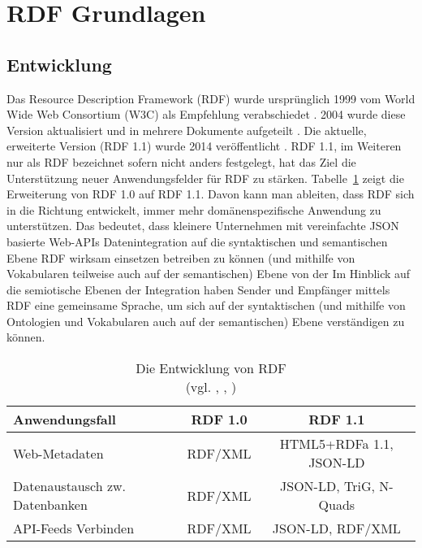 \section{RDF Grundlagen}
\subsection{Entwicklung}
\label{sec:entwicklung}

Das Resource Description Framework (RDF) wurde ursprünglich 1999 vom World Wide Web Consortium (W3C) als Empfehlung verabschiedet \parencite{Lassila:99:RMS}. 2004 wurde diese Version aktualisiert und in mehrere Dokumente aufgeteilt \parencite{Beckett:04:RSS}. Die aktuelle, erweiterte Version (RDF 1.1) wurde 2014 veröffentlicht \parencite{Schreiber:14:RP}. RDF 1.1, im Weiteren nur als RDF bezeichnet sofern nicht anders festgelegt, hat das Ziel die Unterstützung neuer Anwendungsfelder für RDF zu stärken. Tabelle~\ref{tab:rdf} zeigt die Erweiterung von RDF 1.0 auf RDF 1.1. Davon kann man ableiten, dass RDF sich in die Richtung entwickelt, immer mehr domänenspezifische Anwendung zu unterstützen. Das bedeutet, dass kleinere Unternehmen mit vereinfachte JSON basierte Web-APIs Datenintegration auf die syntaktischen und semantischen\footnotemark{} Ebene RDF wirksam einsetzen betreiben zu können (und mithilfe von Vokabularen teilweise auch auf der semantischen) Ebene von der Im Hinblick auf die semiotische Ebenen der Integration \parencite[vgl.]{Schissler2004} haben Sender und Empfänger mittels RDF eine gemeinsame Sprache, um sich auf der syntaktischen (und mithilfe von Ontologien und Vokabularen auch auf der semantischen) Ebene verständigen zu können. 

\begin{table}[h]
	\centering
	\begin{tabular}{|p{9em}|c|c|}
		\hline \rule[-2ex]{0pt}{5.5ex} Anwendungsfall & RDF 1.0 & RDF 1.1 \\ 
		\hline \rule[-2ex]{0pt}{5.5ex} Web-Metadaten & RDF/XML & HTML5+RDFa 1.1, JSON-LD\\ 
		\hline \rule[-2ex]{0pt}{5.5ex} Datenaustausch zw. Datenbanken\footnotemark{}& RDF/XML & JSON-LD, TriG, N-Quads  \\
		\hline \rule[-2ex]{0pt}{5.5ex} API-Feeds Verbinden \footnotemark[\value{footnote}] & RDF/XML& JSON-LD, RDF/XML\\ 
		\hline
	\end{tabular}
	\caption{Die Entwicklung von RDF\\ (vgl. \cite[Abs.~2]{Klyne:04:RDF}, \cite[Abs.~2]{Schreiber:14:RP}, \cite{Wood:14:WNR})}
	\label{tab:rdf}
\end{table}

